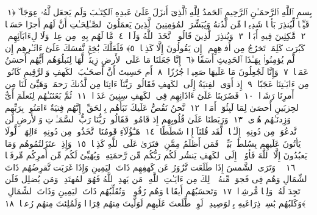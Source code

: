 
  
    
  
    
    

\nopagebreak
  بِسمِ ٱللَّهِ ٱلرَّحمَـٰنِ ٱلرَّحِيمِ
  ٱلحَمدُ لِلَّهِ ٱلَّذِىٓ أَنزَلَ عَلَىٰ عَبدِهِ ٱلكِتَـٰبَ وَلَم يَجعَل لَّهُۥ عِوَجَا ۜ ﴿١﴾
 قَيِّمًۭا لِّيُنذِرَ بَأسًۭا شَدِيدًۭا مِّن لَّدُنهُ وَيُبَشِّرَ ٱلمُؤمِنِينَ ٱلَّذِينَ يَعمَلُونَ ٱلصَّـٰلِحَـٰتِ أَنَّ لَهُم أَجرًا حَسَنًۭا ﴿٢﴾
 مَّٰكِثِينَ فِيهِ أَبَدًۭا ﴿٣﴾
 وَيُنذِرَ ٱلَّذِينَ قَالُوا۟ ٱتَّخَذَ ٱللَّهُ وَلَدًۭا ﴿٤﴾
 مَّا لَهُم بِهِۦ مِن عِلمٍۢ وَلَا لِءَابَآئِهِم ۚ كَبُرَت كَلِمَةًۭ تَخرُجُ مِن أَفوَٟهِهِم ۚ إِن يَقُولُونَ إِلَّا كَذِبًۭا ﴿٥﴾
 فَلَعَلَّكَ بَٰخِعٌۭ نَّفسَكَ عَلَىٰٓ ءَاثَـٰرِهِم إِن لَّم يُؤمِنُوا۟ بِهَـٰذَا ٱلحَدِيثِ أَسَفًا ﴿٦﴾
 إِنَّا جَعَلنَا مَا عَلَى ٱلأَرضِ زِينَةًۭ لَّهَا لِنَبلُوَهُم أَيُّهُم أَحسَنُ عَمَلًۭا ﴿٧﴾
 وَإِنَّا لَجَٰعِلُونَ مَا عَلَيهَا صَعِيدًۭا جُرُزًا ﴿٨﴾
 أَم حَسِبتَ أَنَّ أَصحَـٰبَ ٱلكَهفِ وَٱلرَّقِيمِ كَانُوا۟ مِن ءَايَـٰتِنَا عَجَبًا ﴿٩﴾
 إِذ أَوَى ٱلفِتيَةُ إِلَى ٱلكَهفِ فَقَالُوا۟ رَبَّنَآ ءَاتِنَا مِن لَّدُنكَ رَحمَةًۭ وَهَيِّئ لَنَا مِن أَمرِنَا رَشَدًۭا ﴿١٠﴾
 فَضَرَبنَا عَلَىٰٓ ءَاذَانِهِم فِى ٱلكَهفِ سِنِينَ عَدَدًۭا ﴿١١﴾
 ثُمَّ بَعَثنَـٰهُم لِنَعلَمَ أَىُّ ٱلحِزبَينِ أَحصَىٰ لِمَا لَبِثُوٓا۟ أَمَدًۭا ﴿١٢﴾
 نَّحنُ نَقُصُّ عَلَيكَ نَبَأَهُم بِٱلحَقِّ ۚ إِنَّهُم فِتيَةٌ ءَامَنُوا۟ بِرَبِّهِم وَزِدنَـٰهُم هُدًۭى ﴿١٣﴾
 وَرَبَطنَا عَلَىٰ قُلُوبِهِم إِذ قَامُوا۟ فَقَالُوا۟ رَبُّنَا رَبُّ ٱلسَّمَـٰوَٟتِ وَٱلأَرضِ لَن نَّدعُوَا۟ مِن دُونِهِۦٓ إِلَـٰهًۭا ۖ لَّقَد قُلنَآ إِذًۭا شَطَطًا ﴿١٤﴾
 هَـٰٓؤُلَآءِ قَومُنَا ٱتَّخَذُوا۟ مِن دُونِهِۦٓ ءَالِهَةًۭ ۖ لَّولَا يَأتُونَ عَلَيهِم بِسُلطَٰنٍۭ بَيِّنٍۢ ۖ فَمَن أَظلَمُ مِمَّنِ ٱفتَرَىٰ عَلَى ٱللَّهِ كَذِبًۭا ﴿١٥﴾
 وَإِذِ ٱعتَزَلتُمُوهُم وَمَا يَعبُدُونَ إِلَّا ٱللَّهَ فَأوُۥٓا۟ إِلَى ٱلكَهفِ يَنشُر لَكُم رَبُّكُم مِّن رَّحمَتِهِۦ وَيُهَيِّئ لَكُم مِّن أَمرِكُم مِّرفَقًۭا ﴿١٦﴾
 ۞ وَتَرَى ٱلشَّمسَ إِذَا طَلَعَت تَّزَٰوَرُ عَن كَهفِهِم ذَاتَ ٱليَمِينِ وَإِذَا غَرَبَت تَّقرِضُهُم ذَاتَ ٱلشِّمَالِ وَهُم فِى فَجوَةٍۢ مِّنهُ ۚ ذَٟلِكَ مِن ءَايَـٰتِ ٱللَّهِ ۗ مَن يَهدِ ٱللَّهُ فَهُوَ ٱلمُهتَدِ ۖ وَمَن يُضلِل فَلَن تَجِدَ لَهُۥ وَلِيًّۭا مُّرشِدًۭا ﴿١٧﴾
 وَتَحسَبُهُم أَيقَاظًۭا وَهُم رُقُودٌۭ ۚ وَنُقَلِّبُهُم ذَاتَ ٱليَمِينِ وَذَاتَ ٱلشِّمَالِ ۖ وَكَلبُهُم بَٰسِطٌۭ ذِرَاعَيهِ بِٱلوَصِيدِ ۚ لَوِ ٱطَّلَعتَ عَلَيهِم لَوَلَّيتَ مِنهُم فِرَارًۭا وَلَمُلِئتَ مِنهُم رُعبًۭا ﴿١٨﴾
